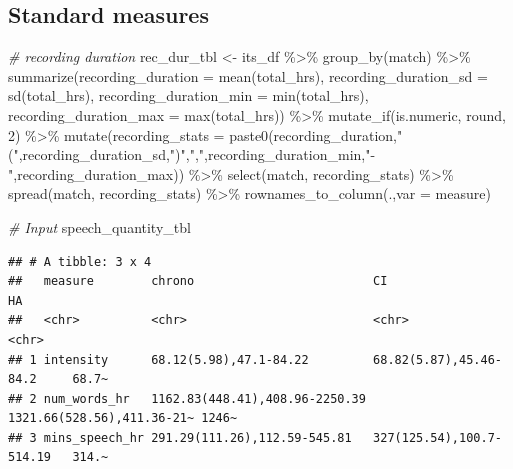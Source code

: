 \documentclass[
]{article}
\newenvironment{Shaded}{\begin{snugshade}}{\end{snugshade}}
\newcommand{\AttributeTok}[1]{\textcolor[rgb]{0.77,0.63,0.00}{#1}}
\newcommand{\CommentTok}[1]{\textcolor[rgb]{0.56,0.35,0.01}{\textit{#1}}}
\newcommand{\DecValTok}[1]{\textcolor[rgb]{0.00,0.00,0.81}{#1}}
\newcommand{\FunctionTok}[1]{\textcolor[rgb]{0.00,0.00,0.00}{#1}}
\newcommand{\NormalTok}[1]{#1}
\newcommand{\OtherTok}[1]{\textcolor[rgb]{0.56,0.35,0.01}{#1}}
\newcommand{\SpecialCharTok}[1]{\textcolor[rgb]{0.00,0.00,0.00}{#1}}
\newcommand{\StringTok}[1]{\textcolor[rgb]{0.31,0.60,0.02}{#1}}
\begin{document}
\hypertarget{standard-measures}{%
\subsection{Standard measures}\label{standard-measures}}

\begin{Shaded}
\begin{Highlighting}[]
\CommentTok{\# recording duration}
\NormalTok{rec\_dur\_tbl }\OtherTok{\textless{}{-}}\NormalTok{ its\_df }\SpecialCharTok{\%\textgreater{}\%}
  \FunctionTok{group\_by}\NormalTok{(match) }\SpecialCharTok{\%\textgreater{}\%}
  \FunctionTok{summarize}\NormalTok{(}\AttributeTok{recording\_duration =} \FunctionTok{mean}\NormalTok{(total\_hrs),}
            \AttributeTok{recording\_duration\_sd =} \FunctionTok{sd}\NormalTok{(total\_hrs),}
            \AttributeTok{recording\_duration\_min =} \FunctionTok{min}\NormalTok{(total\_hrs),}
            \AttributeTok{recording\_duration\_max =} \FunctionTok{max}\NormalTok{(total\_hrs)) }\SpecialCharTok{\%\textgreater{}\%}
  \FunctionTok{mutate\_if}\NormalTok{(is.numeric, round, }\DecValTok{2}\NormalTok{) }\SpecialCharTok{\%\textgreater{}\%}
  \FunctionTok{mutate}\NormalTok{(}\AttributeTok{recording\_stats =} \FunctionTok{paste0}\NormalTok{(recording\_duration,}\StringTok{"("}\NormalTok{,recording\_duration\_sd,}\StringTok{")"}\NormalTok{,}\StringTok{","}\NormalTok{,recording\_duration\_min,}\StringTok{"{-}"}\NormalTok{,recording\_duration\_max)) }\SpecialCharTok{\%\textgreater{}\%}
  \FunctionTok{select}\NormalTok{(match, recording\_stats) }\SpecialCharTok{\%\textgreater{}\%}
  \FunctionTok{spread}\NormalTok{(match, recording\_stats) }\SpecialCharTok{\%\textgreater{}\%}
  \FunctionTok{rownames\_to\_column}\NormalTok{(.,}\AttributeTok{var =} \StringTok{\textquotesingle{}measure\textquotesingle{}}\NormalTok{)}

\CommentTok{\# Input}
\NormalTok{speech\_quantity\_tbl}
\end{Highlighting}
\end{Shaded}

\begin{verbatim}
## # A tibble: 3 x 4
##   measure        chrono                         CI                         HA   
##   <chr>          <chr>                          <chr>                      <chr>
## 1 intensity      68.12(5.98),47.1-84.22         68.82(5.87),45.46-84.2     68.7~
## 2 num_words_hr   1162.83(448.41),408.96-2250.39 1321.66(528.56),411.36-21~ 1246~
## 3 mins_speech_hr 291.29(111.26),112.59-545.81   327(125.54),100.7-514.19   314.~
\end{verbatim}
\end{document}
